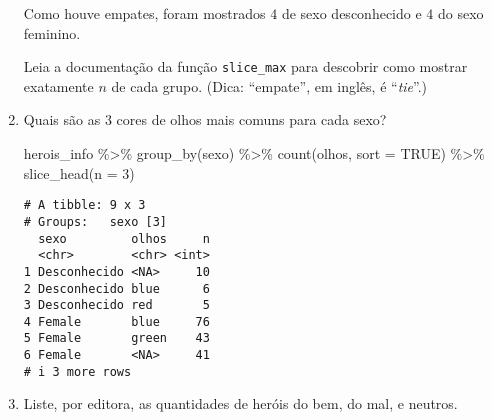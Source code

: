 \documentclass[
  letterpaper,
  DIV=11,
  numbers=noendperiod]{scrreprt}
\newenvironment{Shaded}{\begin{snugshade}}{\end{snugshade}}
\newcommand{\AttributeTok}[1]{\textcolor[rgb]{0.40,0.45,0.13}{#1}}
\newcommand{\ConstantTok}[1]{\textcolor[rgb]{0.56,0.35,0.01}{#1}}
\newcommand{\DecValTok}[1]{\textcolor[rgb]{0.68,0.00,0.00}{#1}}
\newcommand{\FunctionTok}[1]{\textcolor[rgb]{0.28,0.35,0.67}{#1}}
\newcommand{\NormalTok}[1]{\textcolor[rgb]{0.00,0.23,0.31}{#1}}
\newcommand{\SpecialCharTok}[1]{\textcolor[rgb]{0.37,0.37,0.37}{#1}}
\begin{document}
\begin{enumerate}
\begin{tcolorbox}
  Como houve empates, foram mostrados $4$ de sexo desconhecido e $4$ do
  sexo feminino.

  Leia a documentação da função \texttt{slice\_max} para descobrir como
  mostrar exatamente $n$ de cada grupo. (Dica: ``empate'', em inglês, é
  ``\emph{tie}''.)

  \end{tcolorbox}
\item
  Quais são as $3$ cores de olhos mais comuns para cada sexo?

  \begin{tcolorbox}[enhanced jigsaw, coltitle=black, colbacktitle=quarto-callout-tip-color!10!white, title=\textcolor{quarto-callout-tip-color}{\faLightbulb}\hspace{0.5em}{Resposta}, toprule=.15mm, leftrule=.75mm, opacityback=0, colback=white, arc=.35mm, breakable, bottomtitle=1mm, left=2mm, toptitle=1mm, titlerule=0mm, rightrule=.15mm, bottomrule=.15mm, opacitybacktitle=0.6, colframe=quarto-callout-tip-color-frame]

\begin{Shaded}
\begin{Highlighting}[]
\NormalTok{herois\_info }\SpecialCharTok{\%\textgreater{}\%} 
  \FunctionTok{group\_by}\NormalTok{(sexo) }\SpecialCharTok{\%\textgreater{}\%} 
  \FunctionTok{count}\NormalTok{(olhos, }\AttributeTok{sort =} \ConstantTok{TRUE}\NormalTok{) }\SpecialCharTok{\%\textgreater{}\%} 
  \FunctionTok{slice\_head}\NormalTok{(}\AttributeTok{n =} \DecValTok{3}\NormalTok{)}
\end{Highlighting}
\end{Shaded}

\begin{verbatim}
# A tibble: 9 x 3
# Groups:   sexo [3]
  sexo         olhos     n
  <chr>        <chr> <int>
1 Desconhecido <NA>     10
2 Desconhecido blue      6
3 Desconhecido red       5
4 Female       blue     76
5 Female       green    43
6 Female       <NA>     41
# i 3 more rows
\end{verbatim}

  \end{tcolorbox}
\item
  Liste, por editora, as quantidades de heróis do bem, do mal, e
  neutros.

  \begin{tcolorbox}[enhanced jigsaw, coltitle=black, colbacktitle=quarto-callout-tip-color!10!white, title=\textcolor{quarto-callout-tip-color}{\faLightbulb}\hspace{0.5em}{Resposta}, toprule=.15mm, leftrule=.75mm, opacityback=0, colback=white, arc=.35mm, breakable, bottomtitle=1mm, left=2mm, toptitle=1mm, titlerule=0mm, rightrule=.15mm, bottomrule=.15mm, opacitybacktitle=0.6, colframe=quarto-callout-tip-color-frame]


\end{tcolorbox}
\end{enumerate}
\end{document}
